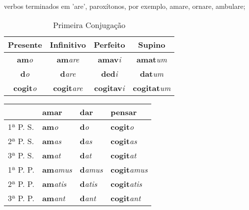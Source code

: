 \documentclass{book}
\newcommand{\radicaldesinencia}[2]{\textbf{#1}\textit{#2}}
\begin{document}
verbos terminados em 'are', paroxítonos, por exemplo, amare, ornare, ambulare; 

\begin{table}
\centering
\caption{Primeira Conjugação}
\vspace{0.2cm}
\begin{tabular}{c|c|c|c}
\hline
Presente		&	Infinitivo		&	Perfeito		&	Supino	\\
\hline                                    		
\radicaldesinencia{am}{o}	&	\radicaldesinencia{am}{are}	&	\radicaldesinencia{amav}{i}	&	\radicaldesinencia{amat}{um}	\\
\radicaldesinencia{d}{o}	&	\radicaldesinencia{d}{are}	&	\radicaldesinencia{ded}{i}	&	\radicaldesinencia{dat}{um}	\\
\radicaldesinencia{cogit}{o}	&	\radicaldesinencia{cogit}{are}	&	\radicaldesinencia{cogitav}{i}	&	\radicaldesinencia{cogitat}{um}	\\
 \hline
\end{tabular}
\end{table}

\begin{table}
\centering
\begin{tabular}{l|l|l|l}
\hline
	&  amar		& dar		& pensar \\
\hline
1ª P. S.	&  \radicaldesinencia{am}{o}		& \radicaldesinencia{d}{o}		& \radicaldesinencia{cogit}{o} \\
2ª P. S.	&  \radicaldesinencia{am}{as} 	& \radicaldesinencia{d}{as}		& \radicaldesinencia{cogit}{as} \\
3ª P. S.	&  \radicaldesinencia{am}{at} 	& \radicaldesinencia{d}{at}		& \radicaldesinencia{cogit}{at} \\
\hline
\hline
1ª P. P.	&  \radicaldesinencia{am}{amus} 	& \radicaldesinencia{d}{amus}	& \radicaldesinencia{cogit}{amus} \\
2ª P. P. 	&  \radicaldesinencia{am}{atis} 	& \radicaldesinencia{d}{atis} 	& \radicaldesinencia{cogit}{atis} \\
3ª P. P.	&  \radicaldesinencia{am}{ant} 	& \radicaldesinencia{d}{ant}		& \radicaldesinencia{cogit}{ant} \\ 
\hline
\end{tabular}
\end{table}
\clearpage
\end{document}
